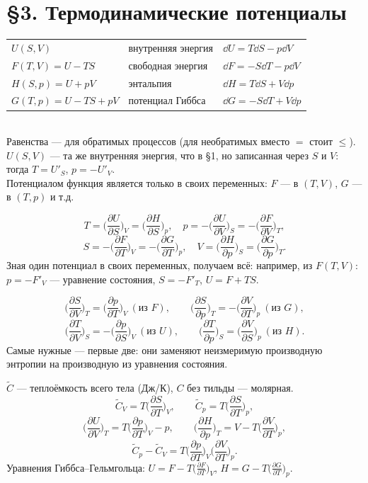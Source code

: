 \section*{§3. Термодинамические потенциалы}

\begin{basics}
\begin{tabular}{@{}lll@{}}
$U(S,V)$ & внутренняя энергия & $\dd U=T\dd S-p\dd V$\\
$F(T,V)=U-TS$ & свободная энергия & $\dd F=-S\dd T-p\dd V$\\
$H(S,p)=U+pV$ & энтальпия & $\dd H=T\dd S+V\dd p$\\
$G(T,p)=U-TS+pV$ & потенциал Гиббса & $\dd G=-S\dd T+V\dd p$
\end{tabular}
\\Равенства — для обратимых процессов (для необратимых вместо $=$ стоит $\le$).
$U(S,V)$ — та же внутренняя энергия, что в §1, но записанная через $S$ и $V$: тогда $T=U'_S$, $p=-U'_V$.\\
Потенциалом функция является только в своих переменных: $F$ — в $(T,V)$, $G$ — в $(T,p)$ и т.д.

\[T=\Big(\frac{\partial U}{\partial S}\Big)_V=\Big(\frac{\partial H}{\partial S}\Big)_p,\quad
p=-\Big(\frac{\partial U}{\partial V}\Big)_S=-\Big(\frac{\partial F}{\partial V}\Big)_T,\]
\[S=-\Big(\frac{\partial F}{\partial T}\Big)_V=-\Big(\frac{\partial G}{\partial T}\Big)_p,\quad
V=\Big(\frac{\partial H}{\partial p}\Big)_S=\Big(\frac{\partial G}{\partial p}\Big)_T.\]
Зная один потенциал в своих переменных, получаем всё: например, из $F(T,V)$: $p=-F'_V$ — уравнение состояния,
$S=-F'_T$, $U=F+TS$.

\[\Big(\frac{\partial S}{\partial V}\Big)_T=\Big(\frac{\partial p}{\partial T}\Big)_V\ (\text{из }F),\qquad
\Big(\frac{\partial S}{\partial p}\Big)_T=-\Big(\frac{\partial V}{\partial T}\Big)_p\ (\text{из }G),\]
\[\Big(\frac{\partial T}{\partial V}\Big)_S=-\Big(\frac{\partial p}{\partial S}\Big)_V\ (\text{из }U),\qquad
\Big(\frac{\partial T}{\partial p}\Big)_S=\Big(\frac{\partial V}{\partial S}\Big)_p\ (\text{из }H).\]
Самые нужные — первые две: они заменяют неизмеримую производную энтропии на производную из уравнения состояния.

$\widetilde C$ — теплоёмкость всего тела (Дж/К), $C$ без тильды — молярная.
\[\widetilde C_V=T\Big(\frac{\partial S}{\partial T}\Big)_V,\qquad \widetilde C_p=T\Big(\frac{\partial S}{\partial T}\Big)_p,\]
\[\Big(\frac{\partial U}{\partial V}\Big)_T=T\Big(\frac{\partial p}{\partial T}\Big)_V-p,\qquad
\Big(\frac{\partial H}{\partial p}\Big)_T=V-T\Big(\frac{\partial V}{\partial T}\Big)_p,\]
\[\widetilde C_p-\widetilde C_V=T\Big(\frac{\partial p}{\partial T}\Big)_V\Big(\frac{\partial V}{\partial T}\Big)_p.\]
Уравнения Гиббса–Гельмгольца: $U=F-T\big(\frac{\partial F}{\partial T}\big)_V$, $H=G-T\big(\frac{\partial G}{\partial T}\big)_p$.


\end{basics}

